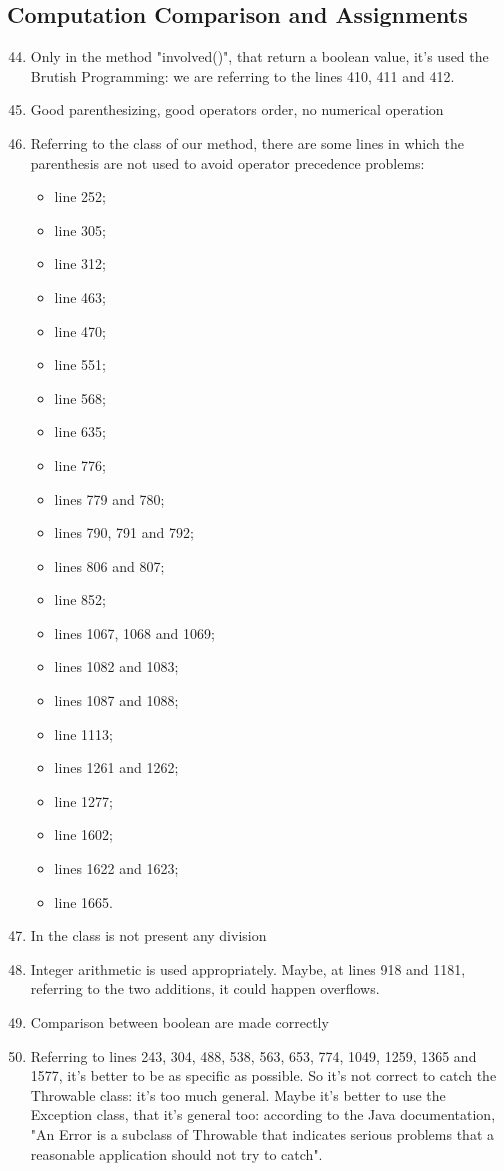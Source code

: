 \subsection{Computation Comparison and Assignments}
\begin{enumerate}
	\setcounter{enumi}{43}
	\item Only in the method "involved()", that return a boolean value, it's used the Brutish Programming: we are referring to the lines 410, 411 and 412.
	\item Good parenthesizing, good operators order, no numerical operation
	\item Referring to the class of our method, there are some lines in which the parenthesis are not used to avoid operator precedence problems:
	    \begin{itemize}
	        \item line 252;
	        \item line 305;
	        \item line 312;
	        \item line 463;
	        \item line 470;
	        \item line 551;
	        \item line 568;
	        \item line 635;
	        \item line 776;
	        \item lines 779 and 780;
	        \item lines 790, 791 and 792;
	        \item lines 806 and 807;
	        \item line 852;
	        \item lines 1067, 1068 and 1069;
	        \item lines 1082 and 1083;
	        \item lines 1087 and 1088;
	        \item line 1113;
	        \item lines 1261 and 1262;
	        \item line 1277;
	        \item line 1602;
	        \item lines 1622 and 1623;
	        \item line 1665. 
	    \end{itemize}
	\item In the class is not present any division
	\item Integer arithmetic is used appropriately. Maybe, at lines 918 and 1181, referring to the two additions, it could happen overflows.
	\item Comparison between boolean are made correctly
	\item Referring to lines 243, 304, 488, 538, 563, 653, 774, 1049, 1259, 1365 and 1577, it's better to be as specific as possible. So it's not correct to catch the Throwable class: it's too much general. Maybe it's better to use the Exception class, that it's general too: according to the Java documentation, "An Error is a subclass of Throwable that indicates serious problems that a reasonable application should not try to catch". 
	

\end{enumerate}
